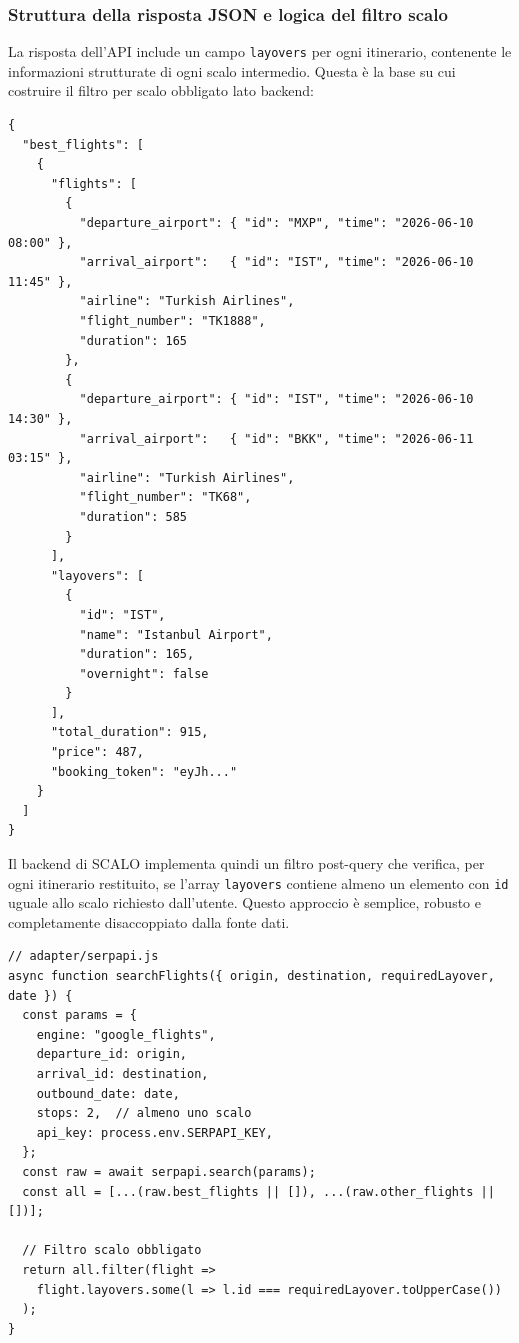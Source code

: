 \documentclass[a4paper, 11pt]{article}
\begin{document}
\subsubsection{Struttura della risposta JSON e logica del filtro scalo}

La risposta dell'API include un campo \texttt{layovers} per ogni itinerario, contenente le informazioni strutturate di ogni scalo intermedio. Questa \`e la base su cui costruire il filtro per scalo obbligato lato backend:

\begin{lstlisting}[caption={Struttura semplificata della risposta SerpApi Google Flights}]
{
  "best_flights": [
    {
      "flights": [
        {
          "departure_airport": { "id": "MXP", "time": "2026-06-10 08:00" },
          "arrival_airport":   { "id": "IST", "time": "2026-06-10 11:45" },
          "airline": "Turkish Airlines",
          "flight_number": "TK1888",
          "duration": 165
        },
        {
          "departure_airport": { "id": "IST", "time": "2026-06-10 14:30" },
          "arrival_airport":   { "id": "BKK", "time": "2026-06-11 03:15" },
          "airline": "Turkish Airlines",
          "flight_number": "TK68",
          "duration": 585
        }
      ],
      "layovers": [
        {
          "id": "IST",
          "name": "Istanbul Airport",
          "duration": 165,
          "overnight": false
        }
      ],
      "total_duration": 915,
      "price": 487,
      "booking_token": "eyJh..."
    }
  ]
}
\end{lstlisting}

Il backend di SCALO implementa quindi un filtro post-query che verifica, per ogni itinerario restituito, se l'array \texttt{layovers} contiene almeno un elemento con \texttt{id} uguale allo scalo richiesto dall'utente. Questo approccio \`e semplice, robusto e completamente disaccoppiato dalla fonte dati.

\begin{lstlisting}[caption={Pseudocodice del filtro scalo obbligato (Node.js/Express)}]
// adapter/serpapi.js
async function searchFlights({ origin, destination, requiredLayover, date }) {
  const params = {
    engine: "google_flights",
    departure_id: origin,
    arrival_id: destination,
    outbound_date: date,
    stops: 2,  // almeno uno scalo
    api_key: process.env.SERPAPI_KEY,
  };
  const raw = await serpapi.search(params);
  const all = [...(raw.best_flights || []), ...(raw.other_flights || [])];

  // Filtro scalo obbligato
  return all.filter(flight =>
    flight.layovers.some(l => l.id === requiredLayover.toUpperCase())
  );
}
\end{lstlisting}
\end{document}
